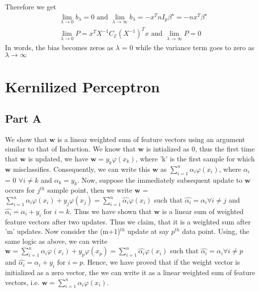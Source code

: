 \documentclass[11pt]{article}
\begin{document}
Therefore we get 
\begin{equation*}
	\begin{split}	
		& \lim\limits_{\lambda \rightarrow 0} b_\lambda = 0 \text{ and }  \lim\limits_{\lambda \rightarrow \infty} b_\lambda = -x^TnI_p\beta^\star = -nx^T\beta^\star \\
		& \lim\limits_{\lambda \rightarrow 0} P = x^TX^{-1} C_{\mathcal{E}}(X^{-1})^Tx \text{ and }  \lim\limits_{\lambda \rightarrow \infty} P = 0
	\end{split}
\end{equation*}
In words, the bias becomes zeros as $\lambda$ = 0 while the variance term goes to zero as $\lambda \rightarrow \infty$
\section{Kernilized Perceptron}
\subsection{Part A}
We show that $\boldsymbol{w}$ is a linear weighted sum of feature vectors using an argument similar to that of Induction.
We know that $\boldsymbol{w}$ is intialized as 0, thus the first time that $\boldsymbol{w}$ is updated, we have $\boldsymbol{w} = y_k\varphi(x_k)$, where 'k' is the first sample for which $\boldsymbol{w}$ misclassifies. Consequently, we can write this $\boldsymbol{w}$ as $\sum_{i=1}^{n}\alpha_i\varphi(x_i)$, where $\alpha_i$ = 0 $\forall i \not= k$ and $\alpha_k = y_k$. Now, suppose the immediately subsequent update to $\boldsymbol{w}$ occurs for $j^{th}$ sample point, then we write $\boldsymbol{w}$ = $\sum_{i=1}^{n}\alpha_i\varphi(x_i) + y_j\varphi(x_j) = \sum_{i=1}^{n}\hat{\alpha_i}\varphi(x_i)$ such that $\hat{\alpha_i} = \alpha_i \forall i \not= j$ and $\hat{\alpha_i} = \alpha_i + y_i \text{ for } i=k$. Thus we have shown that $\boldsymbol{w}$ is a linear sum of weighted feature vectors after two updates. Thus we claim, that it is a weighted sum after 'm' updates. Now consider the (m+1)$^{th}$ update at say $p^{th}$ data point. Using, the same logic as above, we can write $\boldsymbol{w} = \sum_{i=1}^{n}\alpha_i\varphi(x_i) + y_p\varphi(x_p) = \sum_{i=1}^{n}\hat{\alpha_i}\varphi(x_i)$ such that $\hat{\alpha_i} = \alpha_i \forall i \not= p$ and $\hat{\alpha_i} = \alpha_i + y_i \text{ for } i=p$. Hence, we have proved that if the weight vector is initialized as a zero vector, the we can write it as a linear weighted sum of feature vectors, i.e. $\boldsymbol{w} = \sum_{i=1}^{n}\alpha_i\varphi(x_i)$.
\end{document}
